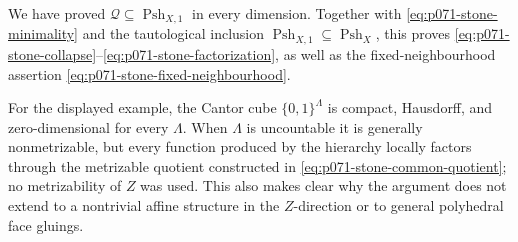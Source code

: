 We have proved
\(\mathscr Q\subseteq\operatorname{Psh}_{X,1}\) in every dimension.
Together with \eqref{eq:p071-stone-minimality} and the tautological
inclusion
\(\operatorname{Psh}_{X,1}\subseteq\operatorname{Psh}_X\), this proves
\eqref{eq:p071-stone-collapse}--\eqref{eq:p071-stone-factorization}, as
well as the fixed-neighbourhood assertion
\eqref{eq:p071-stone-fixed-neighbourhood}.

For the displayed example, the Cantor cube \(\{0,1\}^{\Lambda}\) is compact,
Hausdorff, and zero-dimensional for every \(\Lambda\).  When \(\Lambda\) is
uncountable it is generally nonmetrizable, but every function produced by
the hierarchy locally factors through the metrizable quotient constructed
in \eqref{eq:p071-stone-common-quotient}; no metrizability of \(Z\) was
used.  This also makes clear why
the argument does not extend to a nontrivial affine structure in the
\(Z\)-direction or to general polyhedral face gluings.
